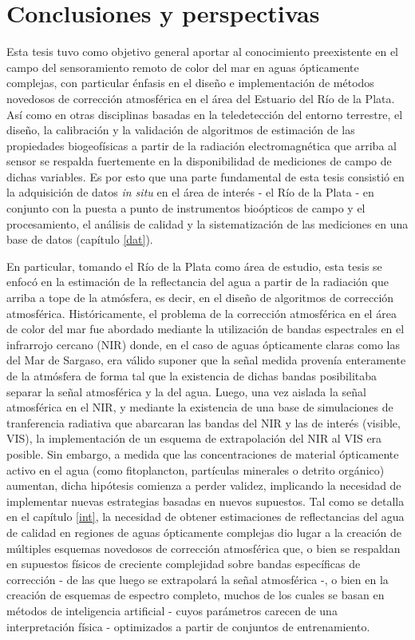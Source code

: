 \chapter{Conclusiones y perspectivas}
\label{con}

Esta tesis tuvo como objetivo general aportar al conocimiento preexistente en el campo del sensoramiento remoto de color del mar en aguas ópticamente complejas, con particular énfasis en el diseño e implementación de métodos novedosos de corrección atmosférica en el área del Estuario del Río de la Plata.
%
Así como en otras disciplinas basadas en la teledetección del entorno terrestre, el diseño, la calibración y la validación de algoritmos de estimación de las propiedades biogeofísicas a partir de la radiación electromagnética que arriba al sensor se respalda fuertemente en la disponibilidad de mediciones de campo de dichas variables. Es por esto que una parte fundamental de esta tesis consistió en la adquisición de datos \textit{in situ} en el área de interés - el Río de la Plata - en conjunto con la puesta a punto de instrumentos bioópticos de campo y el procesamiento, el análisis de calidad y la sistematización de las mediciones en una base de datos (capítulo \ref{dat}).

En particular, tomando el Río de la Plata como área de estudio, esta tesis se enfocó en la estimación de la reflectancia del agua a partir de la radiación que arriba a tope de la atmósfera, es decir, en el diseño de algoritmos de corrección atmosférica. Históricamente, el problema de la corrección atmosférica en el área de color del mar fue abordado mediante la utilización de bandas espectrales en el infrarrojo cercano (NIR) donde, en el caso de aguas ópticamente claras como las del Mar de Sargaso, era válido suponer que la señal medida provenía enteramente de la atmósfera de forma tal que la existencia de dichas bandas posibilitaba separar la señal atmosférica y la del agua. Luego, una vez aislada la señal atmosférica en el NIR, y mediante la existencia de una base de simulaciones de tranferencia radiativa que abarcaran las bandas del NIR y las de interés (visible, VIS), la implementación de un esquema de extrapolación del NIR al VIS era posible.
%
Sin embargo, a medida que las concentraciones de material ópticamente activo en el agua (como fitoplancton, partículas minerales o detrito orgánico) aumentan, dicha hipótesis comienza a perder validez, implicando la necesidad de implementar nuevas estrategias basadas en nuevos supuestos. Tal como se detalla en el capítulo \ref{int}, la necesidad de obtener estimaciones de reflectancias del agua de calidad en regiones de aguas ópticamente complejas dio lugar a la creación de múltiples esquemas novedosos de corrección atmosférica que, o bien se respaldan en supuestos físicos de creciente complejidad sobre bandas específicas de corrección - de las que luego se extrapolará la señal atmosférica -, o bien en la creación de esquemas de espectro completo, muchos de los cuales se basan en métodos de inteligencia artificial - cuyos parámetros carecen de una interpretación física - optimizados a partir de conjuntos de entrenamiento. 

